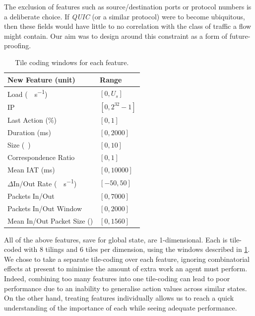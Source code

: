 \documentclass[conference, letterpaper, 10pt, times]{IEEEtran}
\begin{document}
The exclusion of features such as source/destination ports or protocol numbers is a deliberate choice.
If \emph{QUIC} (or a similar protocol) were to become ubiquitous, then these fields would have little to no correlation with the class of traffic a flow might contain.
Our aim was to design around this constraint as a form of future-proofing.

\begin{table}
	\centering
	\caption{Tile coding windows for each feature.\label{tab:codings}}
	
	\begin{tabular}{@{}ll@{}}
		\toprule
		New Feature (unit) & Range \\
		\midrule
		Load (\si{\mega\bit\per\second}) & $[0, U_s]$ \\
		IP & $[0, 2^{32}-1]$ \\
		Last Action (\si{\percent}) & $[0, 1]$ \\
		Duration (\si{\milli\second}) & $[0, \num{2000}]$ \\
		Size (\si{\mebi\byte}) & $[0,10]$ \\
		Correspondence Ratio & $[0,1]$ \\
		Mean IAT (\si{\milli\second}) & $[0, \num{10000}]$ \\
		$\Delta$In/Out Rate (\si{\mega\bit\per\second}) & $[-50, 50]$ \\
		Packets In/Out & $[0, 7000]$ \\
		Packets In/Out Window & $[0, 2000]$ \\
		Mean In/Out Packet Size (\si{\byte}) & $[0, 1560]$ \\
		\bottomrule
	\end{tabular}
\end{table}

All of the above features, save for global state, are 1-dimensional.
Each is tile-coded with 8 tilings and 6 tiles per dimension, using the windows described in \cref{tab:codings}.
We chose to take a separate tile-coding over each feature, ignoring combinatorial effects at present to minimise the amount of extra work an agent must perform.
Indeed, combining too many features into one tile-coding can lead to poor performance due to an inability to generalise action values across similar states.
On the other hand, treating features individually allows us to reach a quick understanding of the importance of each while seeing adequate performance.
\end{document}
